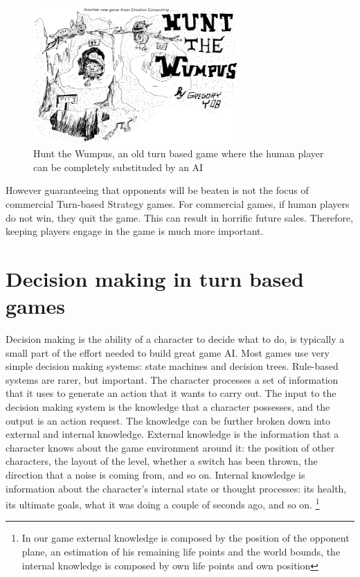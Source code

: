 \begin{figure}
  \centering
      \includegraphics[width=0.7\textwidth]{images/wumpus.png}
  \caption{Hunt the Wumpus, an old turn based game where the human player can be completely substituded by an AI}
\end{figure}

However guaranteeing that opponents will be beaten is not the focus of commercial Turn-based Strategy games. For commercial games, if human players do not win, they quit the game. This can result in horrific future sales. Therefore, keeping players engage in the game is much more important.

\section{Decision making in turn based games}

Decision making is the ability of a character to decide what to do, is typically a small part of the effort needed to build great game AI.
Most games use very simple decision making systems: state machines and decision trees.
Rule-based systems are rarer, but important.
The character processes a set of information that it uses to generate an action that it wants to carry out. The input to the decision making system is the knowledge that a character possesses, and the output is an action request. The knowledge can be further broken down into external and internal knowledge. External knowledge is the information that a character knows about the game environment around it: the position of other characters, the layout of the level, whether a switch has been thrown, the direction that a noise is coming from, and so on. Internal knowledge is information about the character’s internal state or thought processes: its health, its ultimate goals, what it was doing a couple of seconds ago, and so on.
\footnote{In our game external knowledge is composed by the position of the opponent plane, an estimation of his remaining life points and the world bounds, the internal knowledge is composed by own life points and own position}

